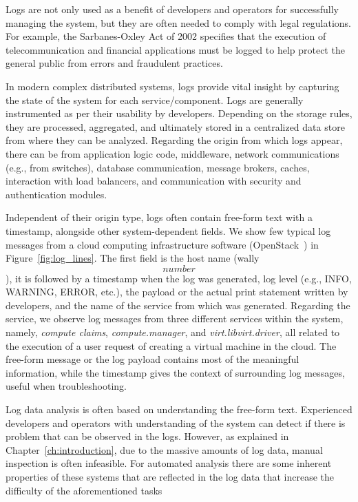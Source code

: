 Logs are not only used as a benefit of developers and operators for successfully managing the system, but they are often needed to comply with legal regulations. For example, the Sarbanes-Oxley Act of 2002 specifies that the execution of telecommunication and financial applications must be logged to help protect the general public from errors and fraudulent practices.

In modern complex distributed systems, logs provide vital insight by capturing the state of the system for each service/component. Logs are generally instrumented as per their usability by developers. Depending on the storage rules, they are processed, aggregated, and ultimately stored in a centralized data store from where they can be analyzed. Regarding the origin from which logs appear, there can be from application logic code, middleware, network communications (e.g., from switches), database communication, message brokers, caches, interaction with load balancers, and communication with security and authentication modules. 

Independent of their origin type, logs often contain free-form text with a timestamp, alongside other system-dependent fields. We show few typical log messages from a cloud computing infrastructure software (OpenStack~\cite{openstack}) in Figure~\ref{fig:log_lines}. The first field is the host name (wally\[number\]), it is followed by a timestamp when the log was generated, log level (e.g., INFO, WARNING, ERROR, etc.), the payload or the actual print statement written by developers, and the name of the service from which was generated. Regarding the service, we observe log messages from three different services within the system, namely, \textit{compute claims}, \textit{compute.manager}, and \textit{virt.libvirt.driver}, all related to the execution of a user request of creating a virtual machine in the cloud. The free-form message or the log payload contains most of the meaningful information, while the timestamp gives the context of surrounding log messages, useful when troubleshooting. 

Log data analysis is often based on understanding the free-form text. Experienced developers and operators with understanding of the system can detect if there is problem that can be observed in the logs. However, as explained in Chapter~\ref{ch:introduction}, due to the massive amounts of log data, manual inspection is often infeasible. For automated analysis there are some inherent properties of these systems that are reflected in the log data that increase the difficulty of the aforementioned tasks 


